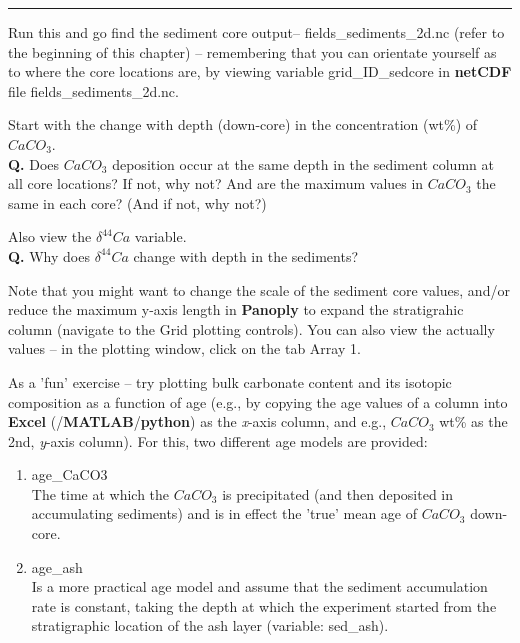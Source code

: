 \vspace{1mm}\noindent\rule{4cm}{0.1mm}\vspace{2mm}

\noindent Run this and go find the sediment core output-- \textsf{\footnotesize fields\_sediments\_2d.nc} (refer to the beginning of this chapter) -- remembering that you can orientate yourself as to where the core locations are, by viewing variable \textsf{\footnotesize grid\_ID\_sedcore} in \textbf{netCDF} file \textsf{\footnotesize fields\_sediments\_2d.nc}.

\vspace{1mm}
\noindent Start with the change with depth (down-core) in the concentration (wt\%) of $CaCO_{3}$.
\vspace{1mm}
\\\textbf{Q.} Does $CaCO_{3}$ deposition occur at the same depth in the sediment column at all core locations? If not, why not? And are the maximum values in $CaCO_{3}$ the same in each core? (And if not, why not?)

Also view the $\delta ^{44}Ca$ variable.
\vspace{1mm}
\\\textbf{Q.} Why does $\delta ^{44}Ca$ change with depth in the sediments?

\vspace{1mm}
Note that you might want to change the scale of the sediment core values, and/or reduce the maximum y-axis length in \textbf{Panoply} to expand the stratigrahic column (navigate to the \textsf{\footnotesize Grid} plotting controls). You can also view the actually values -- in the plotting window, click on the tab \textsf{\footnotesize Array 1}.

\vspace{1mm}
As a 'fun' exercise -- try plotting bulk carbonate content and its isotopic composition as a function of age (e.g., by copying the age values of a column into \textbf{Excel} (/\textbf{MATLAB}/\textbf{python}) as the \textit{x}-axis column, and e.g., $CaCO_{3}$ wt\% as the 2nd, \textit{y}-axis column). For this, two different age models are provided:

\vspace{1mm}
\begin{enumerate}[noitemsep]
\item \textsf{\footnotesize age\_CaCO3}
\\The time at which the $CaCO_{3}$ is precipitated (and then deposited in accumulating sediments) and is in effect the 'true' mean age of $CaCO_{3}$ down-core.
\item \textsf{\footnotesize age\_ash}
\\Is a more practical age model and assume that the sediment accumulation rate is constant, taking the depth at which the experiment started from the stratigraphic location of the ash layer (variable: \textsf{\footnotesize sed\_ash}).
\end{enumerate}
\vspace{1mm}

